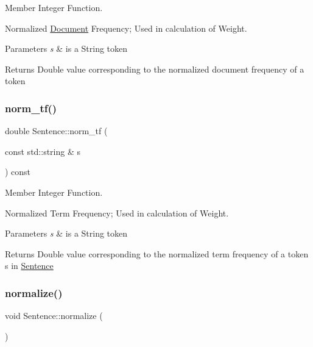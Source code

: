 Member Integer Function. 

Normalized \hyperlink{class_document}{Document} Frequency; Used in calculation of Weight.


\begin{DoxyParams}{Parameters}
{\em s} & is a String token \\
\hline
\end{DoxyParams}
\begin{DoxyReturn}{Returns}
Double value corresponding to the normalized document frequency of a token 
\end{DoxyReturn}
\mbox{\label{class_sentence_a28fab0061fe288f5ed66bdedf05eb82e}} 
\subsubsection{\texorpdfstring{norm\+\_\+tf()}{norm\_tf()}}
{\footnotesize\ttfamily double Sentence\+::norm\+\_\+tf (\begin{DoxyParamCaption}\item[{const std\+::string \&}]{s }\end{DoxyParamCaption}) const\hspace{0.3cm}{\ttfamily [private]}}



Member Integer Function. 

Normalized Term Frequency; Used in calculation of Weight.


\begin{DoxyParams}{Parameters}
{\em s} & is a String token \\
\hline
\end{DoxyParams}
\begin{DoxyReturn}{Returns}
Double value corresponding to the normalized term frequency of a token s in \hyperlink{class_sentence}{Sentence} 
\end{DoxyReturn}
\mbox{\label{class_sentence_a69d6f959ca6dfb72a73e8f35f9a12afa}} 
\subsubsection{\texorpdfstring{normalize()}{normalize()}}
{\footnotesize\ttfamily void Sentence\+::normalize (\begin{DoxyParamCaption}{ }\end{DoxyParamCaption})\hspace{0.3cm}{\ttfamily [private]}}



